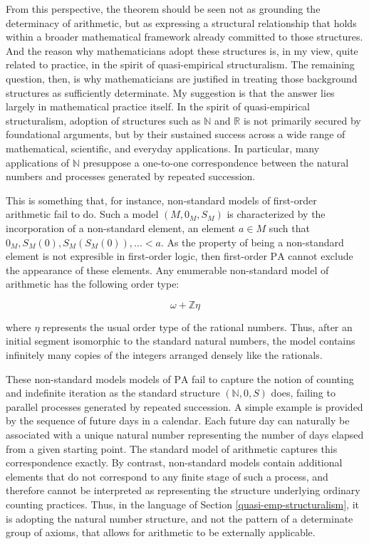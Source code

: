 \documentclass[11pt,a4paper]{article}
\begin{document}
From this perspective, the theorem should be seen not as grounding the determinacy of arithmetic, but as expressing a structural relationship that holds within a broader mathematical framework already committed to those structures. And the reason why mathematicians adopt these structures is, in my view, quite related to practice, in the spirit of quasi-empirical structuralism. The remaining question, then, is why mathematicians are justified in treating those background structures as sufficiently determinate. My suggestion is that the answer lies largely in mathematical practice itself. In the spirit of quasi-empirical structuralism, adoption of structures such as $\mathbb{N}$ and $\mathbb{R}$ is not primarily secured by foundational arguments, but by their sustained success across a wide range of mathematical, scientific, and everyday applications. In particular, many applications of $\mathbb{N}$ presuppose a one-to-one correspondence between the natural numbers and processes generated by repeated succession. 

This is something that, for instance, non-standard models of first-order arithmetic fail to do. Such a model $(M, 0_M, S_M)$ is characterized by the incorporation of a non-standard element, an element $a\in M$ such that $0_M, S_M(0), S_M(S_M(0)),... < a$. As the property of being a non-standard element is not expresible in first-order logic, then first-order $\mathrm{PA}$ cannot exclude the appearance of these elements. Any enumerable non-standard model of arithmetic has the following order type:

$$\omega+ \mathbb{Z} \eta$$ 

where $\eta$ represents the usual order type of the rational numbers. Thus, after an initial segment isomorphic to the standard natural numbers, the model contains infinitely many copies of the integers arranged densely like the rationals.

These non-standard models models of $\mathrm{PA}$ fail to capture the notion of counting and indefinite iteration as the standard structure $(\mathbb{N},0,S)$ does, failing to parallel processes generated by repeated succession. A simple example is provided by the sequence of future days in a calendar. Each future day can naturally be associated with a unique natural number representing the number of days elapsed from a given starting point. The standard model of arithmetic captures this correspondence exactly. By contrast, non-standard models contain additional elements that do not correspond to any finite stage of such a process, and therefore cannot be interpreted as representing the structure underlying ordinary counting practices. Thus, in the language of Section \ref{quasi-emp-structuralism}, it is adopting the natural number structure, and not the pattern of a determinate group of axioms, that allows for arithmetic to be externally applicable.
\end{document}
